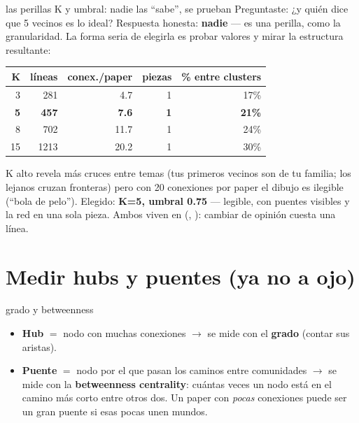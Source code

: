 \documentclass[11pt,a4paper]{article}
\begin{document}
\begin{concepto}{las perillas K y umbral: nadie las ``sabe'', se prueban}
Preguntaste: ¿y quién dice que 5 vecinos es lo ideal? Respuesta honesta: \textbf{nadie} — es
una perilla, como la granularidad. La forma seria de elegirla es probar valores y mirar la
estructura resultante:

\begin{center}
\begin{tabular}{rrrrr}
\textbf{K} & \textbf{líneas} & \textbf{conex./paper} & \textbf{piezas} & \textbf{\% entre clusters} \\
\hline
3 & 281 & 4.7 & 1 & 17\% \\
\textbf{5} & \textbf{457} & \textbf{7.6} & \textbf{1} & \textbf{21\%} \\
8 & 702 & 11.7 & 1 & 24\% \\
15 & 1213 & 20.2 & 1 & 30\% \\
\end{tabular}
\end{center}

K alto revela más cruces entre temas (tus primeros vecinos son de tu familia; los lejanos
cruzan fronteras) pero con 20 conexiones por paper el dibujo es ilegible (``bola de pelo'').
Elegido: \textbf{K=5, umbral 0.75} — legible, con puentes visibles y la red en una sola
pieza. Ambos viven en  (,
): cambiar de opinión cuesta una línea.
\end{concepto}

\section{Medir hubs y puentes (ya no a ojo)}

\begin{concepto}{grado y betweenness}
\begin{itemize}
  \item \textbf{Hub} $=$ nodo con muchas conexiones $\rightarrow$ se mide con el
        \textbf{grado} (contar sus aristas).
  \item \textbf{Puente} $=$ nodo por el que pasan los caminos entre comunidades $\rightarrow$
        se mide con la \textbf{betweenness centrality}: cuántas veces un nodo está en el
        camino más corto entre otros dos. Un paper con \emph{pocas} conexiones puede ser un
        gran puente si esas pocas unen mundos.
\end{itemize}
\end{concepto}
\end{document}
